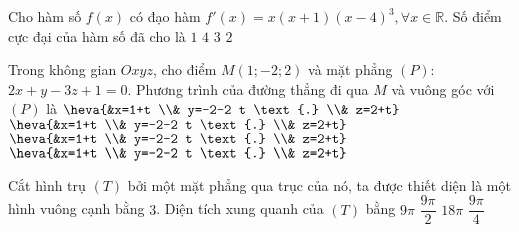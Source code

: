 \begin{ex}%
Cho hàm số $f(x)$ có đạo hàm $f'(x)=x(x+1)(x-4)^3, \forall x \in \mathbb{R}$. Số điểm cực đại của hàm số đã cho là
\choice
{\True $1$}
{$4$}
{$3$}
{$2$}

\end{ex}
\begin{ex}%
Trong không gian $O x y z$, cho điểm $M(1;-2; 2)$ và mặt phẳng $(P)$: $2 x+y-3 z+1=0$. Phương trình của đường thẳng đi qua $M$ và vuông góc với $(P)$ là
\choice
{$\heva{&x=1+t \\& y=-2-2 t \text {.} \\& z=2+t}$}
{\True $\heva{&x=1+t \\& y=-2-2 t \text {.} \\& z=2+t}$}
{$\heva{&x=1+t \\& y=-2-2 t \text {.} \\& z=2+t}$}
{$\heva{&x=1+t \\& y=-2-2 t \text {.} \\& z=2+t}$}

\end{ex}
\begin{ex}%
Cắt hình trụ $(T)$ bởi một mặt phẳng qua trục của nó, ta được thiết diện là một hình vuông cạnh bằng $3$. Diện tích xung quanh của $(T)$ bằng
\choice
{\True $9\pi$}
{$\dfrac{9\pi}{2}$}
{$18\pi$}
{$\dfrac{9\pi}{4}$}

\end{ex}
\begin{ex}%
{\vspace{-0.5cm}
}

\end{ex}

